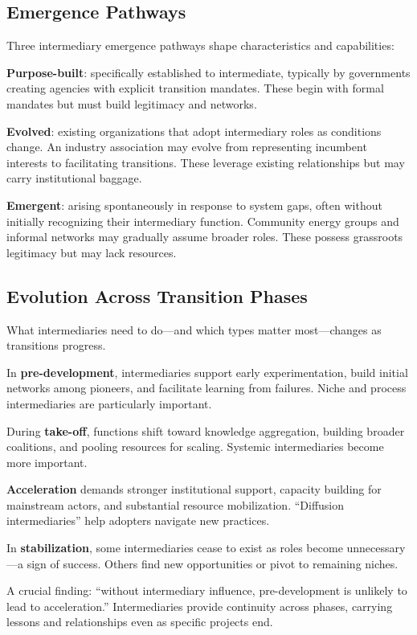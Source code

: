 \documentclass[../main.tex]{subfiles}
\begin{document}
\subsection{Emergence Pathways}

Three intermediary emergence pathways shape characteristics and capabilities:

\textbf{Purpose-built}: specifically established to intermediate, typically by governments creating agencies with explicit transition mandates. These begin with formal mandates but must build legitimacy and networks.

\textbf{Evolved}: existing organizations that adopt intermediary roles as conditions change. An industry association may evolve from representing incumbent interests to facilitating transitions. These leverage existing relationships but may carry institutional baggage.

\textbf{Emergent}: arising spontaneously in response to system gaps, often without initially recognizing their intermediary function. Community energy groups and informal networks may gradually assume broader roles. These possess grassroots legitimacy but may lack resources.

\subsection{Evolution Across Transition Phases}

What intermediaries need to do---and which types matter most---changes as transitions progress.

In \textbf{pre-development}, intermediaries support early experimentation, build initial networks among pioneers, and facilitate learning from failures. Niche and process intermediaries are particularly important.

During \textbf{take-off}, functions shift toward knowledge aggregation, building broader coalitions, and pooling resources for scaling. Systemic intermediaries become more important.

\textbf{Acceleration} demands stronger institutional support, capacity building for mainstream actors, and substantial resource mobilization. ``Diffusion intermediaries'' help adopters navigate new practices.

In \textbf{stabilization}, some intermediaries cease to exist as roles become unnecessary---a sign of success. Others find new opportunities or pivot to remaining niches.

A crucial finding: ``without intermediary influence, pre-development is unlikely to lead to acceleration.'' Intermediaries provide continuity across phases, carrying lessons and relationships even as specific projects end.
\end{document}
